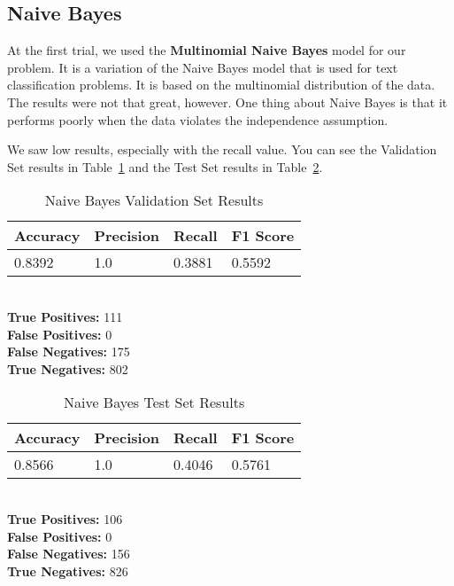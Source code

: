 \documentclass[conference]{IEEEtran}
\begin{document}
\subsection{Naive Bayes}

At the first trial, we used the \textbf{Multinomial Naive Bayes} model for our problem. It is a variation of the Naive Bayes model that is used for text classification problems. It is based on the multinomial distribution of the data. The results were not that great, however. One thing about Naive Bayes is that it performs poorly when the data violates the independence assumption.

We saw low results, especially with the recall value. You can see the Validation Set results in Table \ref{tab:nb1} and the Test Set results in Table \ref{tab:nb2}.

\begin{table}[H]
    \caption{Naive Bayes Validation Set Results}

    \begin{tabularx}{\linewidth}{|X|X|X|X|}
        \hline
        \textbf{Accuracy} & \textbf{Precision} & \textbf{Recall} & \textbf{F1 Score} \\
        \hline
        0.8392 & 1.0 & 0.3881 & 0.5592 \\
        \hline
    \end{tabularx}\\

    \textbf{True Positives:} 111\\
    \textbf{False Positives:} 0\\
    \textbf{False Negatives:} 175\\
    \textbf{True Negatives:} 802
    \label{tab:nb1}
\end{table}

\begin{table}[H]
    \caption{Naive Bayes Test Set Results}

    \begin{tabularx}{\linewidth}{|X|X|X|X|}
        \hline
        \textbf{Accuracy} & \textbf{Precision} & \textbf{Recall} & \textbf{F1 Score} \\
        \hline
        0.8566 & 1.0 & 0.4046 & 0.5761 \\
        \hline
    \end{tabularx}\\

    \textbf{True Positives:} 106\\
    \textbf{False Positives:} 0\\
    \textbf{False Negatives:} 156\\
    \textbf{True Negatives:} 826
    \label{tab:nb2}
\end{table}
\end{document}
